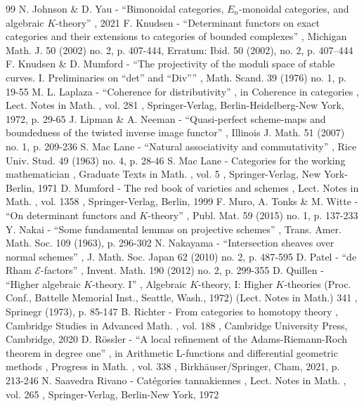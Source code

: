 \documentclass[11pt]{article}
\theoremstyle{plain}
\theoremstyle{definition}
\begin{document}
\begin{thebibliography}{99}
 N. Johnson \& D. Yau - “Bimonoidal categories, $E_n$-monoidal categories, and algebraic $K$-theory” , 2021
 F. Knudsen - “Determinant functors on exact categories and their extensions to categories of bounded complexes” , Michigan Math. J. 50 (2002) no. 2, p. 407-444, Erratum: Ibid. 50 (2002), no. 2, p. 407–444
 F. Knudsen \& D. Mumford - “The projectivity of the moduli space of stable curves. I. Preliminaries on “det” and “Div”” , Math. Scand. 39 (1976) no. 1, p. 19-55
 M. L. Laplaza - “Coherence for distributivity” , in Coherence in categories , Lect. Notes in Math. , vol. 281 , Springer-Verlag, Berlin-Heidelberg-New York, 1972, p. 29-65
 J. Lipman \& A. Neeman - “Quasi-perfect scheme-maps and boundedness of the twisted inverse image functor” , Illinois J. Math. 51 (2007) no. 1, p. 209-236
 S. Mac Lane - “Natural associativity and commutativity” , Rice Univ. Stud. 49 (1963) no. 4, p. 28-46
 S. Mac Lane - Categories for the working mathematician , Graduate Texts in Math. , vol. 5 , Springer-Verlag, New York-Berlin, 1971
 D. Mumford - The red book of varieties and schemes , Lect. Notes in Math. , vol. 1358 , Springer-Verlag, Berlin, 1999
 F. Muro, A. Tonks \& M. Witte - “On determinant functors and $K$-theory” , Publ. Mat. 59 (2015) no. 1, p. 137-233
 Y. Nakai - “Some fundamental lemmas on projective schemes” , Trans. Amer. Math. Soc. 109 (1963), p. 296-302
 N. Nakayama - “Intersection sheaves over normal schemes” , J. Math. Soc. Japan 62 (2010) no. 2, p. 487-595
 D. Patel - “de Rham ${\mathscr{E}}$-factors” , Invent. Math. 190 (2012) no. 2, p. 299-355
 D. Quillen - “Higher algebraic $K$-theory. I” , Algebraic $K$-theory, I: Higher $K$-theories (Proc. Conf., Battelle Memorial Inst., Seattle, Wash., 1972) (Lect. Notes in Math.) 341 , Sprinegr (1973), p. 85-147
 B. Richter - From categories to homotopy theory , Cambridge Studies in Advanced Math. , vol. 188 , Cambridge University Press, Cambridge, 2020
 D. Rössler - “A local refinement of the Adams-Riemann-Roch theorem in degree one” , in Arithmetic L-functions and differential geometric methods , Progress in Math. , vol. 338 , Birkhäuser/Springer, Cham, 2021, p. 213-246
 N. Saavedra Rivano - Catégories tannakiennes , Lect. Notes in Math. , vol. 265 , Springer-Verlag, Berlin-New York, 1972

\end{thebibliography}
\end{document}
